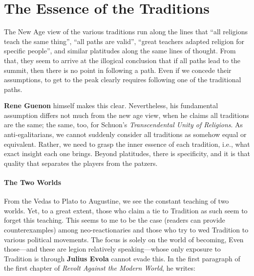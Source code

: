 \section{The Essence of the Traditions}

The New Age view of the various traditions run along the lines that ``all religions teach the same thing'', ``all paths are valid'', ``great teachers adapted religion for specific people'', and similar platitudes along the same lines of thought. From that, they seem to arrive at the illogical conclusion that if all paths lead to the summit, then there is no point in following a path. Even if we concede their assumptions, to get to the peak clearly requires following one of the traditional paths.

\textbf{Rene Guenon} himself makes this clear. Nevertheless, his fundamental assumption differs not much from the new age view, when he claims all traditions are the same; the same, too, for Schuon's
\emph{Transcendental Unity of Religions}. As anti-egalitarians, we cannot suddenly consider all traditions as somehow equal or equivalent. Rather, we need to grasp the inner essence of each tradition, i.e., what exact insight each one brings. Beyond platitudes, there is specificity, and it is that quality that separates the players from the patzers.

\paragraph{The Two Worlds}


From the Vedas to Plato to Augustine, we see the constant teaching of two worlds. Yet, to a great extent, those who claim a tie to Tradition as such seem to forget this teaching. This seems to me to be the case (readers can provide counterexamples) among neo-reactionaries and those who try to wed Tradition to various political movements. The focus is solely on the world of becoming, Even those---and these are legion relatively speaking---whose only exposure to Tradition is through \textbf{Julius Evola} cannot evade this. In the first paragraph of the first chapter of \emph{Revolt Against the Modern World}, he writes:

